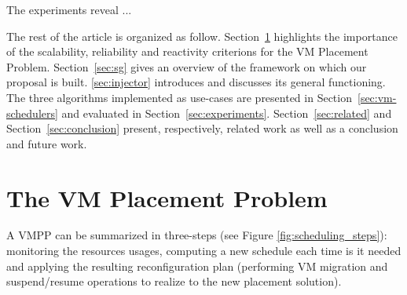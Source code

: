 The experiments reveal ...

The rest of the article is
organized as follow. Section~\ref{sec:vmpp} highlights the importance
of the scalability, reliability and reactivity criterions for the VM
Placement Problem.
Section~\ref{sec:sg} gives an overview of the \sg
framework on which our proposal is built. \ref{sec:injector}
introduces \vmps and discusses its general functioning. The three
algorithms implemented as use-cases are presented in
Section~\ref{sec:vm-schedulers} and evaluated in
Section~\ref{sec:experiments}. Section~\ref{sec:related} and
Section~\ref{sec:conclusion} present, respectively, related work as
well as a conclusion and future work.

\section{The VM Placement Problem}
\label{sec:vmpp}

A VMPP can be summarized in three-steps (see Figure
\ref{fig:scheduling_steps}): monitoring the resources usages,
computing a new schedule each time is it needed and applying the
resulting reconfiguration plan (\ie performing VM migration and
suspend/resume operations to realize to the new placement solution).

